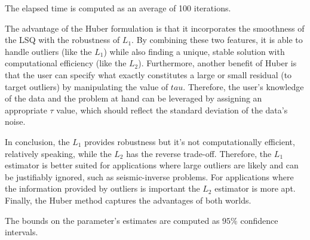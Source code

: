 \begin{table}[htb]
\centering

\caption{The elapsed time is computed as an average of 100 iterations.}
\label{tab:tableCPU}
\end{table}

The advantage of the Huber formulation is that it incorporates the smoothness of the LSQ with the robustness of $L_1$. By combining these two features, it is able to handle outliers (like the $L_1$) while also finding a unique, stable solution with computational efficiency (like the $L_2$). Furthermore, another benefit of Huber is that the user can specify what exactly constitutes a large or small residual (to target outliers)  by manipulating the value of $tau$. Therefore, the user's knowledge of the data and the problem at hand can be leveraged by assigning an appropriate $\tau$ value, which should reflect the standard deviation of the data's noise. 

In conclusion, the $L_1$ provides robustness but it's not computationally efficient, relatively speaking, while the $L_2$ has the reverse trade-off.  Therefore, the $L_1$ estimator is better suited for applications where  large outliers are likely and can be justifiably ignored, such as seismic-inverse problems. For applications where the information provided by outliers is important the $L_2$ estimator is more apt. Finally, the Huber method captures the advantages of both worlds.


\vspace*{\fill} 
\begin{table}[htb]
\centering

\caption{The bounds on the parameter's estimates are computed as $95\%$ confidence intervals. }
\label{tab:table2}
\end{table}
\vspace*{\fill} 
